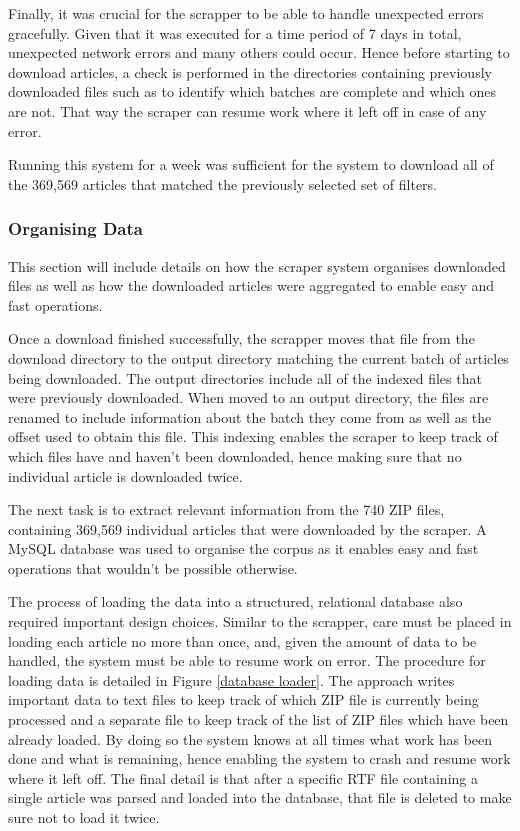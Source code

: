 Finally, it was crucial for the scrapper to be able to handle unexpected errors gracefully. Given that it was executed for a time period of 7 days in total, unexpected network errors and many others could occur. Hence before starting to download articles, a check is performed in the directories containing previously downloaded files such as to identify which batches are complete and which ones are not. That way the scraper can resume work where it left off in case of any error.

Running this system for a week was sufficient for the system to download all of the 369,569 articles that matched the previously selected set of filters.

\subsubsection{Organising Data}

This section will include details on how the scraper system organises downloaded files as well as how the downloaded articles were aggregated to enable easy and fast operations.

Once a download finished successfully, the scrapper moves that file from the download directory to the output directory matching the current batch of articles being downloaded. The output directories include all of the indexed files that were previously downloaded. When moved to an output directory, the files are renamed to include information about the batch they come from as well as the offset used to obtain this file. This indexing enables the scraper to keep track of which files have and haven't been downloaded, hence making sure that no individual article is downloaded twice.

The next task is to extract relevant information from the 740 ZIP files, containing 369,569 individual articles that were downloaded by the scraper. A MySQL database was used to organise the corpus as it enables easy and fast operations that wouldn't be possible otherwise.

The process of loading the data into a structured, relational database also required important design choices. Similar to the scrapper, care must be placed in loading each article no more than once, and, given the amount of data to be handled, the system must be able to resume work on error. The procedure for loading data is detailed in Figure \ref{database loader}. The approach writes important data to text files to keep track of which ZIP file is currently being processed and a separate file to keep track of the list of ZIP files which have been already loaded. By doing so the system knows at all times what work has been done and what is remaining, hence enabling the system to crash and resume work where it left off. The final detail is that after a specific RTF file containing a single article was parsed and loaded into the database, that file is deleted to make sure not to load it twice.

